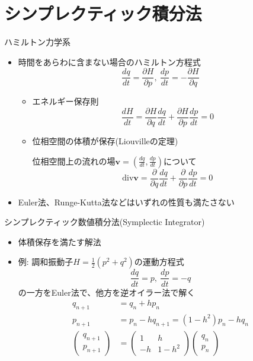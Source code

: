 \section{シンプレクティック積分法}

\begin{frame}[t,fragile]{ハミルトン力学系}
  \begin{itemize}
  \item 時間をあらわに含まない場合のハミルトン方程式
    \[
    \frac{dq}{dt} = \frac{\partial H}{\partial p}, \ \frac{dp}{dt} = -\frac{\partial H}{\partial q}
    \]
    \begin{itemize}
    \item エネルギー保存則
      \[
      \frac{dH}{dt} = \frac{\partial H}{\partial q} \frac{dq}{dt} + \frac{\partial H}{\partial p} \frac{dp}{dt} = 0
      \]
    \item 位相空間の体積が保存(Liouvilleの定理)

      位相空間上の流れの場$\bm{v} = (\frac{dq}{dt},\frac{dp}{dt})$について
      \[
      \text{div} \bm{v} = \frac{\partial}{\partial q} \frac{dq}{dt} + \frac{\partial}{\partial p} \frac{dp}{dt} = 0
      \]
    \end{itemize}
  \item Euler法、Runge-Kutta法などはいずれの性質も満たさない
  \end{itemize}
\end{frame}

\begin{frame}[t,fragile]{シンプレクティック数値積分法(Symplectic Integrator)}
  \begin{itemize}
  \item 体積保存を満たす解法
  \item 例: 調和振動子$H=\frac{1}{2}(p^2+q^2)$の運動方程式
    \[
    \frac{dq}{dt} = p, \ \frac{dp}{dt} = -q
    \]
    の一方をEuler法で、他方を逆オイラー法で解く
    \begin{align*}
      q_{n+1} &= q_n + h p_n \\
      p_{n+1} &= p_n - h q_{n+1} = (1-h^2) p_n - h q_n \\
      \begin{pmatrix} q_{n+1} \\ p_{n+1} \end{pmatrix} &= \begin{pmatrix} 1 & h \\ -h & 1-h^2 \end{pmatrix} \begin{pmatrix} q_{n} \\ p_{n} \end{pmatrix}
    \end{align*}
  \end{itemize}
\end{frame}

